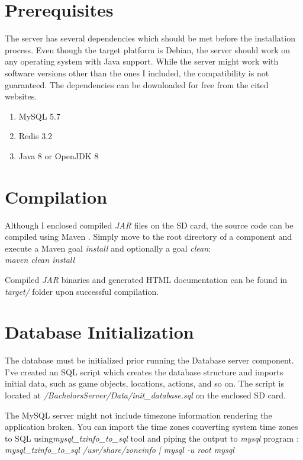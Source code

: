 \section{Prerequisites}
The server has several dependencies which should be met before the installation process. Even though the target platform is Debian, the server should work on any operating system with Java support. While the server might work with software versions other than the ones I included, the compatibility is not guaranteed. The dependencies can be downloaded for free from the cited websites.

\begin{enumerate}
	\item MySQL 5.7 \cite{mysql}
	\item Redis 3.2 \cite{redis}
	\item Java 8 or OpenJDK 8	
\end{enumerate}

\section{Compilation}
Although I enclosed compiled \textit{JAR} files on the SD card, the source code can be compiled using Maven \cite{maven}. Simply move to the root directory of a component and execute a Maven goal \textit{install} and optionally a goal \textit{clean}:\\
\emph{maven clean install}

Compiled \textit{JAR} binaries and generated HTML documentation can be found in \textit{target/} folder upon successful compilation.

\section{Database Initialization}
The database must be initialized prior running the Database server component. I've created an SQL script which creates the database structure and imports initial data, such as game objects, locations, actions, and so on. The script is located at \textit{/BachelorsServer/Data/init\_database.sql} on the enclosed SD card.

The MySQL server might not include timezone information rendering the application broken. You can import the time zones converting system time zones to SQL using\textit{mysql\_tzinfo\_to\_sql} tool and piping the output to \textit{mysql} program \cite{mysqltimezones}:\\
\emph{mysql\_tzinfo\_to\_sql /usr/share/zoneinfo | mysql -u root mysql}

